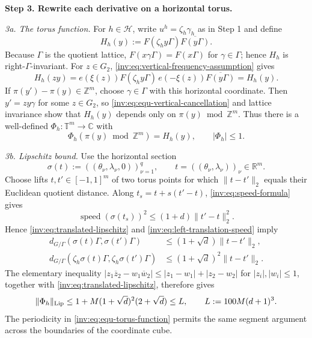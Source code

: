 \documentclass[twoside]{aomart}
\makeatletter
\theoremstyle{paperplain}
\theoremstyle{paperdefinition}
\renewenvironment{proof}[1][\proofname]{\par\pushQED{\qed}%
  \normalfont\topsep6\p@\@plus3\p@\relax\trivlist
  \item[\hskip\labelsep\itshape #1\@addpunct{.}]\ignorespaces
}{\popQED\endtrivlist\@endpefalse}
\numberwithin{equation}{section}
\makeatother
\begin{document}
\begin{proof}
\par
\medskip
\noindent\textbf{Step 3. Rewrite each derivative on a horizontal torus.}

\noindent\emph{3a. The torus function.}
For $h\in\mathcal H$, write
$u^h=\zeta_h\gamma_h$ as in Step 1 and define
\begin{equation*}
 H_h(y):=F(\zeta_hy\Gamma)\overline{F(y\Gamma)}.
\end{equation*}
Because $\Gamma$ is the quotient lattice,
$F(x\gamma\Gamma)=F(x\Gamma)$ for $\gamma\in\Gamma$; hence
$H_h$ is right-$\Gamma$-invariant. For $z\in G_2$,
\eqref{inv:eq:vertical-frequency-assumption} gives
\begin{equation}
 H_h(zy)
 =e(\xi(z))F(\zeta_hy\Gamma)\,
  e(-\xi(z))\overline{F(y\Gamma)}
 =H_h(y).
\label{inv:eq:equ-vertical-cancellation}
\end{equation}
If $\pi(y')-\pi(y)\in\mathbb Z^m$, choose
$\gamma\in\Gamma$ with this horizontal coordinate. Then
$y'=zy\gamma$ for some $z\in G_2$, so
\eqref{inv:eq:equ-vertical-cancellation} and lattice invariance
show that $H_h(y)$ depends only on $\pi(y)\bmod\mathbb Z^m$. Thus
there is a well-defined $\Phi_h:\mathbb T^m\to\mathbb C$ with
\begin{equation}
 \Phi_h(\pi(y)\bmod\mathbb Z^m)=H_h(y),\qquad |\Phi_h|\le1.
\label{inv:eq:equ-torus-function}
\end{equation}

\noindent\emph{3b. Lipschitz bound.}
Use the horizontal section
\[
 \sigma(t):=((\theta_\nu,\lambda_\nu,0))_{\nu=1}^{q},
 \qquad t=((\theta_\nu,\lambda_\nu))_\nu\in\mathbb R^m.
\]
Choose lifts $t,t'\in[-1,1]^m$ of two torus points for which
$\|t-t'\|_2$ equals their Euclidean quotient distance. Along
$t_s=t+s(t'-t)$, \eqref{inv:eq:speed-formula} gives
\begin{equation*}
 \operatorname{speed}(\sigma(t_s))^2
 \le(1+d)\|t'-t\|_2^2.
\end{equation*}
Hence \eqref{inv:eq:translated-lipschitz} and
\eqref{inv:eq:left-translation-speed} imply
\begin{equation*}
 \begin{aligned}
 d_{G/\Gamma}(\sigma(t)\Gamma,\sigma(t')\Gamma)
   &\le(1+\sqrt d)\|t-t'\|_2,\\
 d_{G/\Gamma}(\zeta_h\sigma(t)\Gamma,
              \zeta_h\sigma(t')\Gamma)
   &\le(1+\sqrt d)^2\|t-t'\|_2.
 \end{aligned}
\end{equation*}
The elementary inequality
$|z_1\overline z_2-w_1\overline w_2|
 \le|z_1-w_1|+|z_2-w_2|$ for $|z_i|,|w_i|\le1$, together with
\eqref{inv:eq:translated-lipschitz}, therefore gives
\begin{equation}
 \|\Phi_h\|_{\rm Lip}
 \le1+M(1+\sqrt d)^2(2+\sqrt d)
 \le L,\qquad L:=100M(d+1)^3.
\label{inv:eq:equ-torus-lipschitz}
\end{equation}
The periodicity in \eqref{inv:eq:equ-torus-function} permits the same segment argument across
the boundaries of the coordinate cube.


\end{proof}
\end{document}
